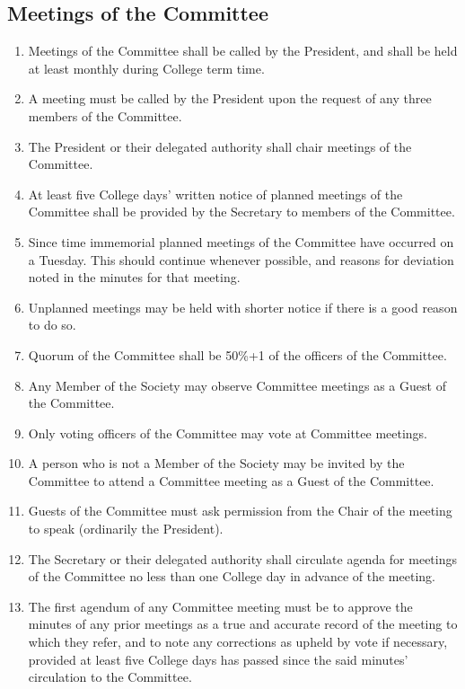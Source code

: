 \documentclass[a4paper]{tufte-handout}
\newcommand{\policyOffset}{12pt}
\newcommand{\policyBye}[2][\policyOffset]{\marginnote[#1]{\textsc{Bye-laws \S#2}}}
\begin{document}
\subsection{Meetings of the Committee}
\begin{enumerate}[resume]
    \item Meetings of the Committee shall be called by the President, and shall be held at least monthly during College term time.
    \item A meeting must be called by the President upon the request of any three members of the Committee.
    \item The President or their delegated authority shall chair meetings of the Committee.
    \item At least five College days' written notice of planned meetings of the Committee shall be provided by the Secretary to members of the Committee.
    \item Since time immemorial planned meetings of the Committee have occurred on a Tuesday. This should continue whenever possible, and reasons for deviation noted in the minutes for that meeting.
    \item Unplanned meetings may be held with shorter notice if there is a good reason to do so.
    \item \policyBye{B11} Quorum of the Committee shall be 50\%+1 of the officers of the Committee.
    \item Any Member of the Society may observe Committee meetings as a Guest of the Committee.
    \item Only voting officers of the Committee may vote at Committee meetings.
    \item A person who is not a Member of the Society may be invited by the Committee to attend a Committee meeting as a Guest of the Committee.
    \item Guests of the Committee must ask permission from the Chair of the meeting to speak (ordinarily the President).
    \item The Secretary or their delegated authority shall circulate agenda for meetings of the Committee no less than one College day in advance of the meeting.
    \item The first agendum of any Committee meeting must be to approve the minutes of any prior meetings as a true and accurate record of the meeting to which they refer, and to note any corrections as upheld by vote if necessary, provided at least five College days has passed since the said minutes' circulation to the Committee. 

\end{enumerate}
\end{document}
